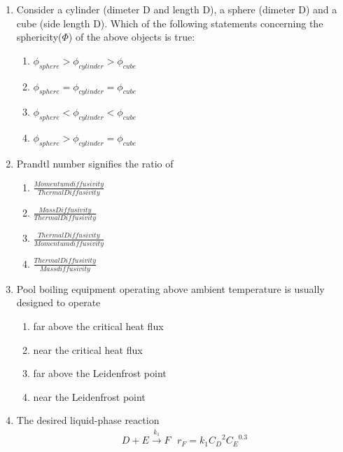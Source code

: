 \documentclass[journal]{IEEEtran}
\begin{document}
\begin{enumerate}
    \item Consider a cylinder (dimeter D and length D), a sphere (dimeter D) and a cube (side length D). Which of the following statements concerning the sphericity($\Phi$) of the above objects is true:
\begin{multicols}{2}
    \begin{enumerate}
        \item $\phi_{sphere} > \phi_{cylinder} > \phi_{cube}$
        \item $\phi_{sphere} = \phi_{cylinder} = \phi_{cube}$
        \item $\phi_{sphere} < \phi_{cylinder} < \phi_{cube}$
        \item $\phi_{sphere} > \phi_{cylinder} = \phi_{cube} $
    \end{enumerate}
\end{multicols}

    \item Prandtl number signifies the ratio of
\begin{multicols}{2}
    \begin{enumerate}
    \item $\frac{Momentum diffusivity}{Thermal Diffusivity}$
    \item $\frac{Mass Diffusivity}{Thermal Diffusivity}$
    \item $\frac{Thermal Diffusivity}{Momentum diffusivity}$
    \item $\frac{Thermal Diffusivity}{Mass diffusivity}$
    \end{enumerate}
\end{multicols}

    \item Pool boiling equipment operating above ambient temperature is usually designed to operate
\begin{multicols}{2}
    \begin{enumerate}
        \item far above the critical heat flux
        \item near the critical heat flux
        \item far above the Leidenfrost point
        \item near the Leidenfrost point
    \end{enumerate}
\end{multicols}
\newpage
    \item The desired liquid-phase reaction
\begin{align*}
     D + E \overset{k_1}{\to} F \hspace{8pt} r_F = k_1 {C_D}^{2} {C_E}^{0.3} 
\end{align*}
   

\end{enumerate}
\end{document}
